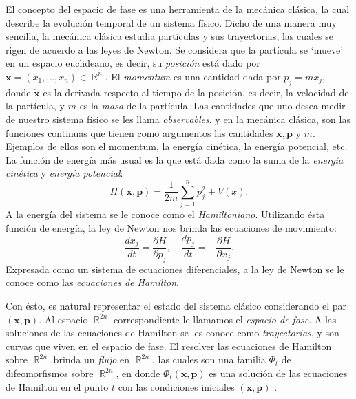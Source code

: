 \documentclass[a4paper]{report}
\DeclareMathOperator{\R}{\mathbb{R}}
\begin{document}
  El concepto del espacio de fase es una herramienta de la
  mecánica clásica, la cual describe la evolución temporal
  de un sistema físico. Dicho de una manera muy sencilla, la
  mecánica clásica estudia partículas y sus trayectorias,
  las cuales se rigen de acuerdo a las leyes de Newton.  Se
  considera que la partícula se `mueve' en un espacio
  euclideano, es decir, su \textit{posición} está dado por
  $\bm{x} = (x_1,\ldots,x_n) \in \R^{n}$. El
  \textit{momentum} es una cantidad dada por $p_j = m \dot
  x_j$, donde $\bm{\dot x}$ es la derivada respecto al
  tiempo de la posición, es decir, la velocidad de la
  partícula, y $m$ es la \textit{masa} de la partícula. Las
  cantidades que uno desea medir de nuestro sistema físico
  se les llama \textit{observables}, y en la mecánica
  clásica, son las funciones continuas que tienen como
  argumentos las cantidades $\bm{x},\bm{p}$ y $m$. Ejemplos
  de ellos son el momentum, la energía cinética, la energía
  potencial, etc. La función de energía más usual es la que
  está dada como la suma de la \textit{energía cinética} y
  \textit{energía potencial}:
  \begin{equation}
    H(\bm{x},\bm{p})
    = \frac{1}{2m} \sum_{j=1}^{n} p_j^2 + V(x).
  \end{equation}
  A la energía del sistema se le conoce como el
  \textit{Hamiltoniano}.  Utilizando ésta función de
  energía, la ley de Newton nos brinda las ecuaciones de
  movimiento:
  \begin{equation}
    \frac{dx_j}{dt}
    = \frac{\partial H}{\partial p_j},
    \quad
    \frac{dp_j}{dt}
    = -\frac{\partial H}{\partial x_j}.
  \end{equation}
  Expresada como un sistema de ecuaciones diferenciales, a
  la ley de Newton se le conoce como las \textit{ecuaciones
  de Hamilton}.  

  Con ésto, es natural representar el estado del sistema
  clásico considerando el par $(\bm{x},\bm{p})$. Al espacio
  $\R^{2n}$ correspondiente le llamamos el \textit{espacio
  de fase}. A las soluciones de las ecuaciones de Hamilton
  se les conoce como \textit{trayectorias}, y son curvas que
  viven en el espacio de fase. El resolver las ecuaciones de
  Hamilton sobre $\R^{2n}$ brinda un \textit{flujo} en
  $\R^{2n}$, las cuales son una familia $\Phi_t$ de
  difeomorfismos sobre $\R^{2n}$, en donde
  $\Phi_t(\bm{x},\bm{p})$ es una solución de las ecuaciones
  de Hamilton en el punto $t$ con las condiciones iniciales
  $(\bm{x},\bm{p})$
  \cite{hallQuantumTheoryMathematicians2013}.
\end{document}
